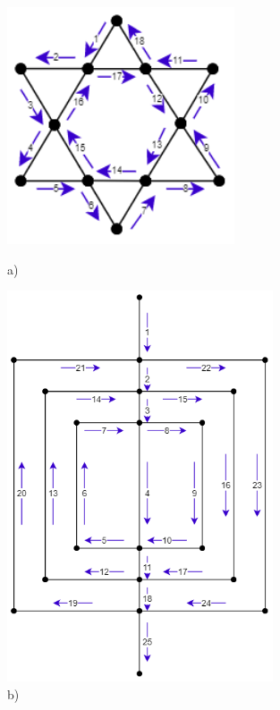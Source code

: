 \documentclass[a4paper]{article}
\begin{document}
	\begin{figure}[H]
		\begin{minipage}{0.5\textwidth}
			\centering
			\includegraphics[width=0.6\textwidth]{tut913_3.png}
			\caption*{a)}
		\end{minipage}
		\begin{minipage}{0.5\textwidth}
			\centering
			\includegraphics[width=0.7\textwidth]{tut913_4.png}
			\caption*{b)}
		\end{minipage}
	\end{figure}
\end{document}
